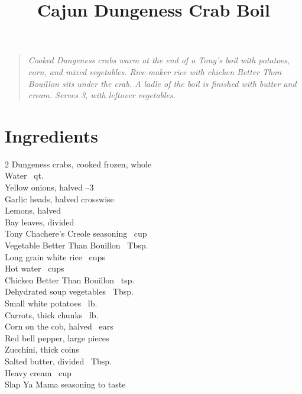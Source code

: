 \documentclass[11pt,letterpaper]{article}
\title{Cajun Dungeness Crab Boil}
\author{}
\date{}
\begin{document}
\maketitle
\thispagestyle{empty}

\begin{quote}\textit{Cooked Dungeness crabs warm at the end of a Tony's boil with potatoes, corn, and mixed vegetables. Rice-maker rice with chicken Better Than Bouillon sits under the crab. A ladle of the boil is finished with butter and cream. Serves 3, with leftover vegetables.}\end{quote}

\section*{Ingredients}
\setlength{\columnsep}{20pt}
\begin{multicols}{2}
\noindent
    Dungeness crabs, cooked frozen, whole  \\
    Water ~qt. \\
    Yellow onions, halved --3 \\
    Garlic heads, halved crosswise  \\
    Lemons, halved  \\
    Bay leaves, divided  \\
    Tony Chachere's Creole seasoning \dotfill {}~cup \\
    Vegetable Better Than Bouillon ~Tbsp. \\
    Long grain white rice ~cups \\
    \columnbreak
    Hot water ~cups \\
    Chicken Better Than Bouillon ~tsp. \\
    Dehydrated soup vegetables ~Tbsp. \\
    Small white potatoes ~lb. \\
    Carrots, thick chunks ~lb. \\
    Corn on the cob, halved ~ears \\
    Red bell pepper, large pieces  \\
    Zucchini, thick coins  \\
    Salted butter, divided ~Tbsp. \\
    Heavy cream \dotfill {}~cup \\
    Slap Ya Mama seasoning \dotfill to taste \\
\end{multicols}
\end{document}
